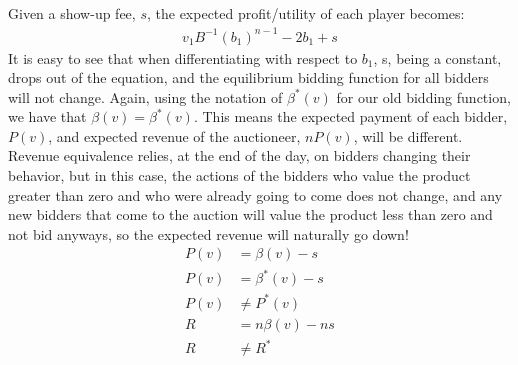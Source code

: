 \documentclass[a4paper,12pt]{article}
\begin{document}
\subsection{}
Given a show-up fee, $s$, the expected profit/utility of each player becomes: 
%
\begin{align*}
v_1B^{-1}(b_1)^{n - 1} - 2b_1 + s
\end{align*}
%
It is easy to see that when differentiating with respect to $b_1$, s, being a constant, drops out of the equation, and the equilibrium bidding function for all bidders will not change. Again, using the notation of $\beta^*(v)$ for our old bidding function, we have that $\beta(v) = \beta^*(v)$. This means the expected payment of each bidder, $P(v)$, and expected revenue of the auctioneer, $nP(v)$, will be different. Revenue equivalence relies, at the end of the day, on bidders changing their behavior, but in this case, the actions of the bidders who value the product greater than zero and who were already going to come does not change, and any new bidders that come to the auction will value the product less than zero and not bid anyways, so the expected revenue will naturally go down! 
%
\begin{align*}
P(v) &= \beta(v) - s \\
P(v) &= \beta^*(v) - s \\
P(v) &\neq P^*(v) \\
R &= n \beta(v) - ns \\
R &\neq R^*
\end{align*}
\end{document}
